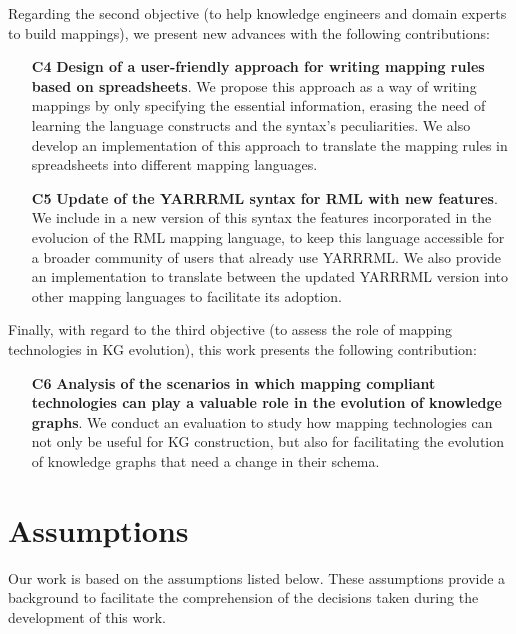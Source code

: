 Regarding the second objective (to help knowledge engineers and domain experts to build mappings), we present new advances with the following contributions:

\begin{enumerate}
    \item[\textbf{C4}] \textbf{Design of a user-friendly approach for writing mapping rules based on spreadsheets}. We propose this approach as a way of writing mappings by only specifying the essential information, erasing the need of learning the language constructs and the syntax's peculiarities. We also develop an implementation of this approach to translate the mapping rules in spreadsheets into different mapping languages. 
    \item[\textbf{C5}] \textbf{Update of the YARRRML syntax for RML with new features}. We include in a new version of this syntax the features incorporated in the evolucion of the RML mapping language, to keep this language accessible for a broader community of users that already use YARRRML. We also provide an implementation to translate between the updated YARRRML version into other mapping languages to facilitate its adoption.
\end{enumerate}

Finally, with regard to the third objective (to assess the role of mapping technologies in KG evolution), this work presents the following contribution:

\begin{enumerate}
    \item[\textbf{C6}]\textbf{ Analysis of the scenarios in which mapping compliant technologies can play a valuable role in the evolution of knowledge graphs}. We conduct an evaluation to study how mapping technologies can not only be useful for KG construction, but also for facilitating the evolution of knowledge graphs that need a change in their schema. 
\end{enumerate}


\section{Assumptions}
\label{sec:chp3-assumptions}
Our work is based on the assumptions listed below. These assumptions provide a background to facilitate the comprehension of the decisions taken during the development of this work. 


